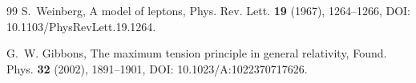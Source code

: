 \documentclass[11pt]{article}
\theoremstyle{definition}
\theoremstyle{plain}
\theoremstyle{remark}
\begin{document}
\begin{thebibliography}{99}
            S.~Weinberg,
            \newblock A model of leptons,
            \newblock Phys. Rev. Lett. \textbf{19} (1967), 1264--1266,
            \newblock DOI: 10.1103/PhysRevLett.19.1264.

            G.~W. Gibbons,
            \newblock The maximum tension principle in general relativity,
            \newblock Found. Phys. \textbf{32} (2002), 1891--1901,
            \newblock DOI: 10.1023/A:1022370717626.

        \end{thebibliography}
\end{document}
